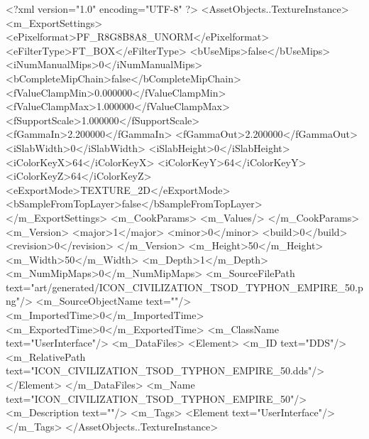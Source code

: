 <?xml version="1.0" encoding="UTF-8" ?>
<AssetObjects..TextureInstance>
	<m_ExportSettings>
		<ePixelformat>PF_R8G8B8A8_UNORM</ePixelformat>
		<eFilterType>FT_BOX</eFilterType>
		<bUseMips>false</bUseMips>
		<iNumManualMips>0</iNumManualMips>
		<bCompleteMipChain>false</bCompleteMipChain>
		<fValueClampMin>0.000000</fValueClampMin>
		<fValueClampMax>1.000000</fValueClampMax>
		<fSupportScale>1.000000</fSupportScale>
		<fGammaIn>2.200000</fGammaIn>
		<fGammaOut>2.200000</fGammaOut>
		<iSlabWidth>0</iSlabWidth>
		<iSlabHeight>0</iSlabHeight>
		<iColorKeyX>64</iColorKeyX>
		<iColorKeyY>64</iColorKeyY>
		<iColorKeyZ>64</iColorKeyZ>
		<eExportMode>TEXTURE_2D</eExportMode>
		<bSampleFromTopLayer>false</bSampleFromTopLayer>
	</m_ExportSettings>
	<m_CookParams>
		<m_Values/>
	</m_CookParams>
	<m_Version>
		<major>1</major>
		<minor>0</minor>
		<build>0</build>
		<revision>0</revision>
	</m_Version>
	<m_Height>50</m_Height>
	<m_Width>50</m_Width>
	<m_Depth>1</m_Depth>
	<m_NumMipMaps>0</m_NumMipMaps>
	<m_SourceFilePath text="art/generated/ICON_CIVILIZATION_TSOD_TYPHON_EMPIRE_50.png"/>
	<m_SourceObjectName text=""/>
	<m_ImportedTime>0</m_ImportedTime>
	<m_ExportedTime>0</m_ExportedTime>
	<m_ClassName text="UserInterface"/>
	<m_DataFiles>
		<Element>
			<m_ID text="DDS"/>
			<m_RelativePath text="ICON_CIVILIZATION_TSOD_TYPHON_EMPIRE_50.dds"/>
		</Element>
	</m_DataFiles>
	<m_Name text="ICON_CIVILIZATION_TSOD_TYPHON_EMPIRE_50"/>
	<m_Description text=""/>
	<m_Tags>
		<Element text="UserInterface"/>
	</m_Tags>
</AssetObjects..TextureInstance>
